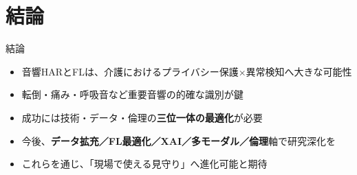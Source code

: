 \documentclass[unicode,12pt,aspectratio=169,dvipdfmx]{beamer}
\begin{document}
\section{結論}
\begin{frame}{結論}
  \begin{itemize}
    \item 音響HARとFLは、介護におけるプライバシー保護×異常検知へ大きな可能性
    \item 転倒・痛み・呼吸音など重要音響の的確な識別が鍵
    \item 成功には技術・データ・倫理の\textbf{三位一体の最適化}が必要
    \item 今後、\textbf{データ拡充／FL最適化／XAI／多モーダル／倫理}軸で研究深化を
    \item これらを通じ、「現場で使える見守り」へ進化可能と期待
  \end{itemize}
\end{frame}
%   
%   
\end{document}
